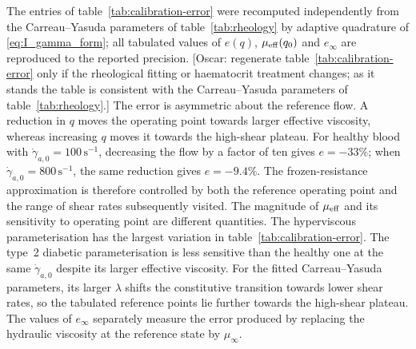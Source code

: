\documentclass[lineno]{jfm}
\begin{document}
The entries of table~\ref{tab:calibration-error} were recomputed
independently from the Carreau--Yasuda parameters of
table~\ref{tab:rheology} by adaptive quadrature of
\eqref{eq:I_gamma_form}; all tabulated values of $e(q)$,
$\mu_{\rm eff}(q_0)$ and $e_\infty$ are reproduced to the reported precision.
{\color{red}[Oscar: regenerate table~\ref{tab:calibration-error} only if the
rheological fitting or haematocrit treatment changes; as it stands the table
is consistent with the Carreau--Yasuda parameters of
table~\ref{tab:rheology}.]}
The error is asymmetric about the reference flow. A reduction in $q$ moves the
operating point towards larger effective viscosity, whereas increasing $q$
moves it towards the high-shear plateau. For healthy blood with
$\dot\gamma_{a,0}=100\,\mathrm{s}^{-1}$, decreasing the flow by a factor of
ten gives $e=-33\%$; when
$\dot\gamma_{a,0}=800\,\mathrm{s}^{-1}$, the same reduction gives
$e=-9.4\%$. The frozen-resistance approximation is therefore controlled by
both the reference operating point and the range of shear rates subsequently
visited.
The magnitude of $\mu_{\rm eff}$ and its sensitivity to operating point are
different quantities. The hyperviscous parameterisation has the largest
variation in table~\ref{tab:calibration-error}. The type~2 diabetic
parameterisation is less sensitive than the healthy one at the same
$\dot\gamma_{a,0}$ despite its larger effective viscosity. For the fitted
Carreau--Yasuda parameters, its larger $\lambda$ shifts the constitutive
transition towards lower shear rates, so the tabulated reference points lie
further towards the high-shear plateau. The values of $e_\infty$ separately
measure the error produced by replacing the hydraulic viscosity at the
reference state by $\mu_\infty$.
\end{document}
